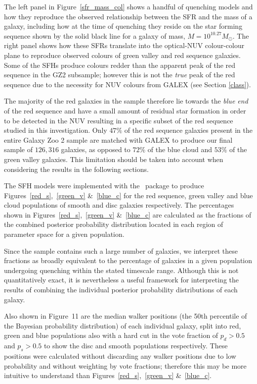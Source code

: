The left panel in Figure~\ref{sfr_mass_col} shows a handful of quenching models and how they reproduce the observed relationship between the SFR and the mass of a galaxy, including how at the time of quenching they reside on the star forming sequence shown by the solid black line for a galaxy of mass, $M = 10^{10.27} M_{\odot}$.   The right panel shows how these SFRs translate into the optical-NUV colour-colour plane to reproduce observed colours of green valley and red sequence galaxies. Some of the SFHs produce colours redder than the apparent peak of the red sequence in the GZ2 subsample; however this is not the \emph{true} peak of the red sequence due to the necessity for NUV colours from GALEX (see Section \ref{class}). 

The majority of the red galaxies in the sample therefore lie towards the \emph{blue end} of the red sequence and have a small amount of residual star formation in order to be detected in the NUV resulting in a specific subset of the red sequence studied in this investigation. Only $47\%$ of the red sequence galaxies present in the entire Galaxy Zoo 2 sample are matched with GALEX to produce our final sample of $126, 316$ galaxies, as opposed to $72\%$ of the blue cloud and $53\%$ of the green valley galaxies. This limitation should be taken into account when considering the results in the following sections.

 The SFH models were implemented with the \starpy ~package to produce Figures~\ref{red_s},~\ref{green_v} \&~\ref{blue_c} for the red sequence, green valley and blue cloud populations of smooth and disc galaxies respectively. The percentages shown in Figures~\ref{red_s},~\ref{green_v} \&~\ref{blue_c} are calculated as the fractions of the combined posterior probability distribution located in each region of parameter space for a given population. 

Since the sample contains such a large number of galaxies, we interpret these fractions as broadly equivalent to the percentage of galaxies in a given population undergoing quenching within the stated timescale range. Although this is not quantitatively exact, it is nevertheless a useful framework for interpreting the results of combining the individual posterior probability distributions of each galaxy.

Also shown in Figure~11 are the median walker positions (the 50th percentile of the Bayesian probability distribution) of each individual galaxy, split into red, green and blue populations also with a hard cut in the vote fraction of $p_d > 0.5$ and $p_s > 0.5$ to show the disc and smooth populations respectively. These positions were calculated without discarding any walker positions due to low probability and without weighting by vote fractions; therefore this may be more intuitive to understand than Figures~\ref{red_s},~\ref{green_v} \&~\ref{blue_c}.

